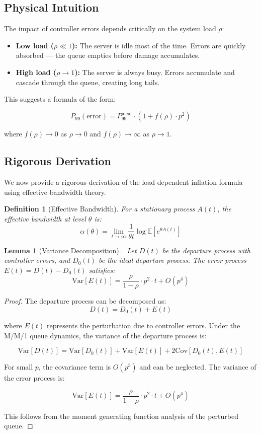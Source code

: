 \documentclass[11pt]{article}
\newtheorem{lemma}[theorem]{Lemma}
\newtheorem{definition}[theorem]{Definition}
\begin{document}
\subsection{Physical Intuition}

The impact of controller errors depends critically on the system load $\rho$:

\begin{itemize}
    \item \textbf{Low load ($\rho \ll 1$):} The server is idle most of the time. Errors are quickly absorbed --- the queue empties before damage accumulates.
    
    \item \textbf{High load ($\rho \to 1$):} The server is always busy. Errors accumulate and cascade through the queue, creating long tails.
\end{itemize}

This suggests a formula of the form:

$$P_{99}(\text{error}) = P_{99}^{\text{ideal}} \cdot (1 + f(\rho) \cdot p^2)$$

where $f(\rho) \to 0$ as $\rho \to 0$ and $f(\rho) \to \infty$ as $\rho \to 1$.

\subsection{Rigorous Derivation}

We now provide a rigorous derivation of the load-dependent inflation formula using effective bandwidth theory.

\begin{definition}[Effective Bandwidth]
For a stationary process $A(t)$, the effective bandwidth at level $\theta$ is:
$$\alpha(\theta) = \lim_{t \to \infty} \frac{1}{\theta t} \log \mathbb{E}[e^{\theta A(t)}]$$
\end{definition}

\begin{lemma}[Variance Decomposition]~\label{lem:variance}
Let $D(t)$ be the departure process with controller errors, and $D_0(t)$ be the ideal departure process. The error process $E(t) = D(t) - D_0(t)$ satisfies:
$$\text{Var}[E(t)] = \frac{\rho}{1-\rho} \cdot p^2 \cdot t + O(p^4)$$
\end{lemma}

\begin{proof}
The departure process can be decomposed as:
$$D(t) = D_0(t) + E(t)$$

where $E(t)$ represents the perturbation due to controller errors. Under the M/M/1 queue dynamics, the variance of the departure process is:

$$\text{Var}[D(t)] = \text{Var}[D_0(t)] + \text{Var}[E(t)] + 2\text{Cov}[D_0(t), E(t)]$$

For small $p$, the covariance term is $O(p^3)$ and can be neglected. The variance of the error process is:

$$\text{Var}[E(t)] = \frac{\rho}{1-\rho} \cdot p^2 \cdot t + O(p^4)$$

This follows from the moment generating function analysis of the perturbed queue.
\end{proof}
\end{document}
